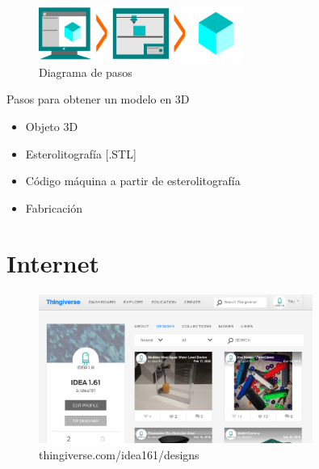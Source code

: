 \documentclass{beamer}
\begin{document}
\begin{frame}
\begin{figure}[h!]
	\centering
	\includegraphics[width=0.6\textwidth]{3dprinting.png}
	\caption{Diagrama de pasos}
	\label{Proceso}
\end{figure}

\begin{block}{Pasos para obtener un modelo en 3D}
	
	\begin{itemize}
		\item Objeto 3D
		\item Esterolitografía [.STL]
		\item Código máquina a partir de esterolitografía
		\item Fabricación
	\end{itemize}
	
\end{block}


\end{frame}


\section{Internet}

\begin{frame}
      \begin{figure}[h!]
   	\centering
   	\includegraphics[width=0.8\textwidth]{thingiverse.png}
   	\caption{thingiverse.com/idea161/designs}
   	\label{thingiverse}
   \end{figure}
\end{frame}
\end{document}

